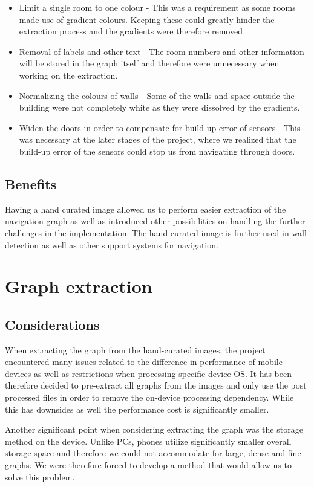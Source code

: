 \documentclass[main.tex]{subfiles}
\begin{document}
		\begin{itemize}
			\item Limit a single room to one colour - This was a requirement as some rooms made use of gradient colours. Keeping these could greatly hinder the extraction process and the gradients were therefore removed
			\item Removal of labels and other text - The room numbers and other information will be stored in the graph itself and therefore were unnecessary when working on the extraction.
			\item Normalizing the colours of walls - Some of the walls and space outside the building were not completely white as they were dissolved by the gradients.
			\item Widen the doors in order to compensate for build-up error of sensors - This was necessary at the later stages of the project, where we realized that the build-up error of the sensors could stop us from navigating through doors.
		\end{itemize}
		
		\subsection{Benefits}
		Having a hand curated image allowed us to perform easier extraction of the navigation graph as well as introduced other possibilities on handling the further challenges in the implementation. The hand curated image is further used in wall-detection as well as other support systems for navigation. 
		
		\section{Graph extraction}
		\subsection{Considerations}
		When extracting the graph from the hand-curated images, the project encountered many issues related to the difference in performance of mobile devices as well as restrictions when processing specific device OS. It has been therefore decided to pre-extract all graphs from the images and only use the  post processed files in order to remove the on-device processing dependency. While this has downsides as well the performance cost is significantly smaller.
		\newline
		
	Another significant point when considering extracting the graph was the storage method on the device. Unlike PCs, phones utilize significantly smaller overall storage space and therefore we could not accommodate for large, dense and fine graphs. We were therefore forced to develop a method that would allow us to solve this problem. 
	\newline
	
\end{document}
